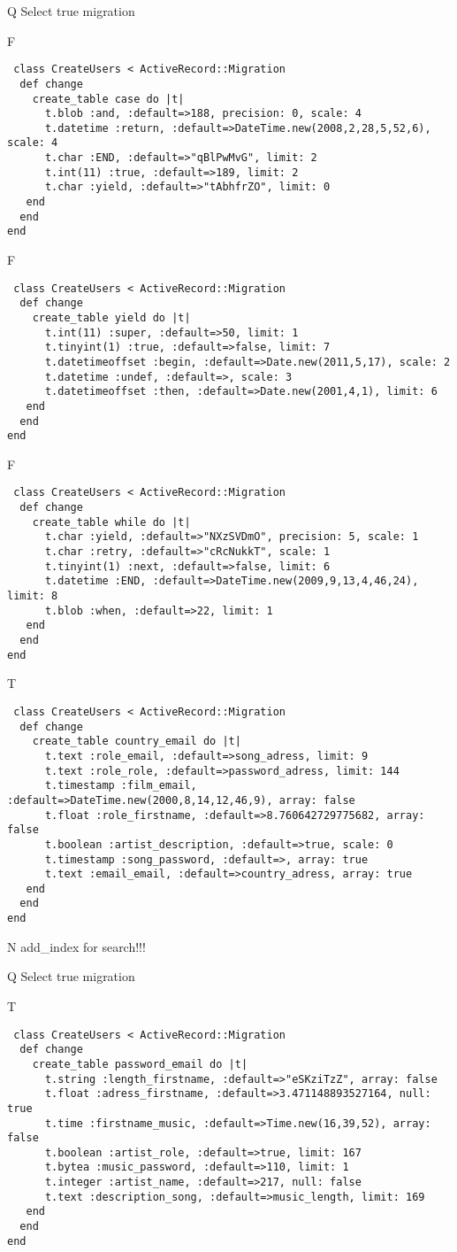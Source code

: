 Q
Select true migration

F
\begin{verbatim}
 class CreateUsers < ActiveRecord::Migration 
  def change 
    create_table case do |t| 
      t.blob :and, :default=>188, precision: 0, scale: 4
      t.datetime :return, :default=>DateTime.new(2008,2,28,5,52,6), scale: 4
      t.char :END, :default=>"qBlPwMvG", limit: 2
      t.int(11) :true, :default=>189, limit: 2
      t.char :yield, :default=>"tAbhfrZO", limit: 0
   end 
  end 
end
\end{verbatim}

F
\begin{verbatim}
 class CreateUsers < ActiveRecord::Migration 
  def change 
    create_table yield do |t| 
      t.int(11) :super, :default=>50, limit: 1
      t.tinyint(1) :true, :default=>false, limit: 7
      t.datetimeoffset :begin, :default=>Date.new(2011,5,17), scale: 2
      t.datetime :undef, :default=>, scale: 3
      t.datetimeoffset :then, :default=>Date.new(2001,4,1), limit: 6
   end 
  end 
end
\end{verbatim}

F
\begin{verbatim}
 class CreateUsers < ActiveRecord::Migration 
  def change 
    create_table while do |t| 
      t.char :yield, :default=>"NXzSVDmO", precision: 5, scale: 1
      t.char :retry, :default=>"cRcNukkT", scale: 1
      t.tinyint(1) :next, :default=>false, limit: 6
      t.datetime :END, :default=>DateTime.new(2009,9,13,4,46,24), limit: 8
      t.blob :when, :default=>22, limit: 1
   end 
  end 
end
\end{verbatim}

T
\begin{verbatim}
 class CreateUsers < ActiveRecord::Migration 
  def change 
    create_table country_email do |t| 
      t.text :role_email, :default=>song_adress, limit: 9
      t.text :role_role, :default=>password_adress, limit: 144
      t.timestamp :film_email, :default=>DateTime.new(2000,8,14,12,46,9), array: false
      t.float :role_firstname, :default=>8.760642729775682, array: false
      t.boolean :artist_description, :default=>true, scale: 0
      t.timestamp :song_password, :default=>, array: true
      t.text :email_email, :default=>country_adress, array: true
   end 
  end 
end
\end{verbatim}
N
add_index for search!!!
  
Q
Select true migration

T
\begin{verbatim}
 class CreateUsers < ActiveRecord::Migration 
  def change 
    create_table password_email do |t| 
      t.string :length_firstname, :default=>"eSKziTzZ", array: false
      t.float :adress_firstname, :default=>3.471148893527164, null: true
      t.time :firstname_music, :default=>Time.new(16,39,52), array: false
      t.boolean :artist_role, :default=>true, limit: 167
      t.bytea :music_password, :default=>110, limit: 1
      t.integer :artist_name, :default=>217, null: false
      t.text :description_song, :default=>music_length, limit: 169
   end 
  end 
end
\end{verbatim}

